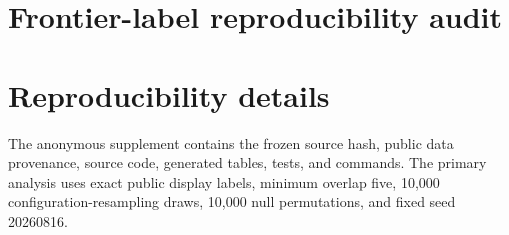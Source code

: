 \documentclass{article}
\begin{document}
\section{Frontier-label reproducibility audit}
\begin{table}[h]
\caption{Supplied HAL frontier labels compared with reconstructed frontiers.}
\centering
\scriptsize

\end{table}

\section{Reproducibility details}
The anonymous supplement contains the frozen source hash, public data provenance, source code, generated tables, tests, and commands. The primary analysis uses exact public display labels, minimum overlap five, 10,000 configuration-resampling draws, 10,000 null permutations, and fixed seed 20260816.


\end{document}
